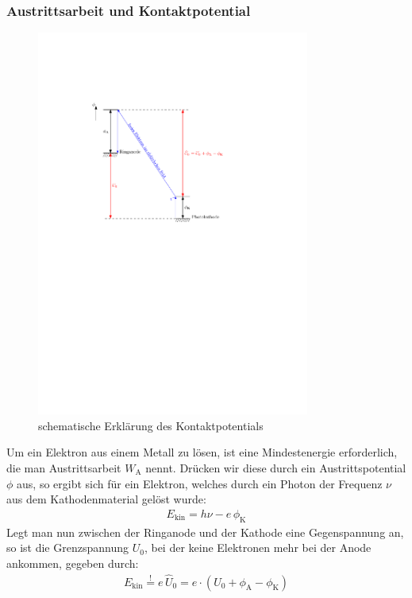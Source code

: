 \documentclass[11pt, a4paper]{article}
\numberwithin{equation}{section}
\begin{document}
\subsubsection{Austrittsarbeit und Kontaktpotential}
\begin{figure}[h]
	\centering
	\includegraphics[width=0.8\textwidth]{./figures/kontaktspannung.pdf}
	\caption{schematische Erklärung des Kontaktpotentials}
	\label{fig:kontaktpotential}
\end{figure}
Um ein Elektron aus einem Metall zu lösen, ist eine Mindestenergie erforderlich, die man Austrittsarbeit $W_\mathrm{A}$ nennt.
Drücken wir diese durch ein Austrittspotential $\phi$ aus, so ergibt sich für ein Elektron, welches durch ein Photon der Frequenz $\nu$ aus dem Kathodenmaterial gelöst wurde:
\begin{align*}
	E_\mathrm{kin} = h \nu - e \, \phi_\mathrm{K}
\end{align*}
Legt man nun zwischen der Ringanode und der Kathode eine Gegenspannung an, so ist die Grenzspannung $U_0$, bei der keine Elektronen mehr bei der Anode ankommen, gegeben durch:
\begin{align*}
	E_\mathrm{kin} \stackrel{!}{=} e \, \hat{U}_0 = e \cdot \left( U_0 + \phi_\mathrm{A} - \phi_\mathrm{K}\right)
\end{align*}
\end{document}
